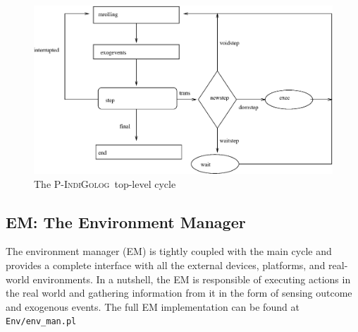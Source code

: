 \documentclass[11pt]{article}
\newcommand{\PIndiGolog}{\mbox{\textsc{P-IndiGolog}}}
\begin{document}
\begin{figure}
\begin{center}
\includegraphics[width=17cm]{legocycle.eps}
\caption{The \PIndiGolog\ top-level cycle}
\label{fig:legocycle}
\end{center}
\end{figure}


\subsection{EM: The Environment Manager \label{sec:envmanager}}

The environment manager (EM) is tightly coupled with the main cycle and
provides a complete interface with all the external devices, platforms, and
real-world environments.
%
In a nutshell, the EM is responsible of executing actions in the real world and
gathering information from it in the form of sensing outcome and exogenous
events.
%
The full EM implementation can be found at \texttt{Env/env\_man.pl}
\end{document}
